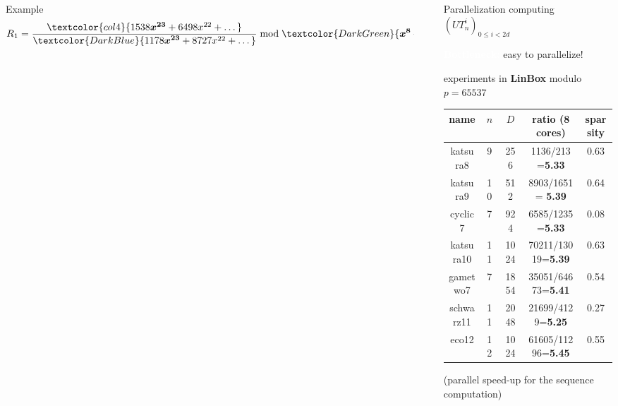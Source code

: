 \documentclass[final]{beamer}
\newlength{\sepwid}
\newlength{\onecolwid}
\newlength{\twocolwid}
\begin{document}
\begin{frame}[t]
\begin{columns}[t]
\begin{column}{\twocolwid}
\begin{alertblock}{{\sf Example}}
	$$R_1 =\frac{ \textcolor{col4}{  1538\boldsymbol{x^{23}} + 6498x^{22} + \dots }}{  \textcolor{DarkBlue}{1178\boldsymbol{x^{23}} + 8727x^{22} + \dots} } \bmod \textcolor{DarkGreen}{{\boldsymbol{x^{8}} + 6990x^{7}+ \dots }} = 7964\boldsymbol{x^7} + 4071x^6 + \dots$$


        \end{alertblock}


\end{column} %

\begin{column}{\sepwid}\end{column} %

\begin{column}{\onecolwid} %

\begin{alertblock}{{\sf Parallelization}}
  { computing $(UT_n^i)_{0 \le i < 2d}$}

  {\sf \textcolor{white}{\bf Bottleneck:} easy to parallelize!}

  {\sf experiments in {\bf LinBox} modulo $p=65537$}

\vspace{1.5em}

  \begin{center}
\begin{tabular}{c||c|c|c|c}
{\sf name} & $n$ & $D$ & {\sf ratio (8 cores)} & sparsity\\ \hline
{\sf katsura8}  & 9 & 256 & 1136/213={\bf 5.33} & 0.63\\
{\sf katsura9} &10 &512 &8903/1651= {\bf5.39} &0.64 \\
{\sf cyclic7}  &7& 924&6585/1235={\bf5.33} &0.08 \\
{\sf katsura10} &11  &1024 &70211/13019={\bf5.39} &0.63 \\
{\sf gametwo7} &7&1854&35051/64673={\bf5.41}&0.54\\
{\sf schwarz11} &11 & 2048&21699/4129={\bf5.25}&0.27\\
{\sf eco12} &12 & 1024& 61605/11296={\bf5.45}&0.55\\
\end{tabular}

\vspace{0.5em}

{\sf (parallel speed-up for the sequence computation)}


\end{center}
\end{alertblock}
\end{column}
\end{columns}
\end{frame}
\end{document}
